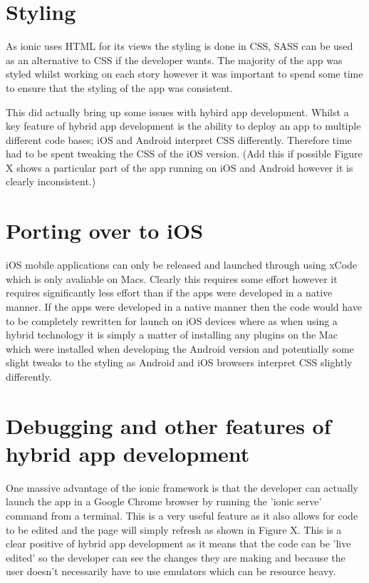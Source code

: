 \section{Styling}
As ionic uses HTML for its views the styling is done in CSS, SASS can be used as an alternative to CSS if the developer wants. The majority of the app was styled whilst working on each story however it was important to spend some time to ensure that the styling of the app was consistent.

This did actually bring up some issues with hybird app development. Whilst a key feature of hybrid app development is the ability to deploy an app to multiple different code bases; iOS and Android interpret CSS differently. Therefore time had to be spent tweaking the CSS of the iOS version. (Add this if possible Figure X shows a particular part of the app running on iOS and Android however it is clearly inconsistent.)

\section{Porting over to iOS}
iOS mobile applications can only be released and launched through using xCode which is only avaliable on Macs. Clearly this requires some effort however it requires significantly less effort than if the apps were developed in a native manner. If the apps were developed in a native manner then the code would have to be completely rewritten for launch on iOS devices where as when using a hybrid technology it is simply a matter of installing any plugins on the Mac which were installed when developing the Android version and potentially some slight tweaks to the styling as Android and iOS browsers interpret CSS slightly differently. 

\section{Debugging and other features of hybrid app development}
One massive advantage of the ionic framework is that the developer can actually launch the app in a Google Chrome browser by running the 'ionic serve' command from a terminal. This is a very useful feature as it also allows for code to be edited and the page will simply refresh as shown in Figure X. This is a clear positive of hybrid app development as it means that the code can be 'live edited' so the developer can see the changes they are making and because the user doesn't necessarily have to use emulators which can be resource heavy.

